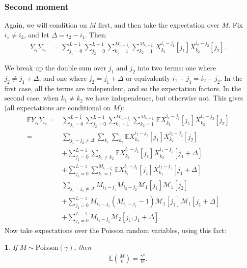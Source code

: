 \documentclass[12pt]{article}
\newcommand{\E}{\mathbb{E}}
\newcommand{\1}{\mathbf{1}}
\newcommand{\Poisson}{\text{Poisson}}
\newcommand{\M}{\mathcal{M}}
\theoremstyle{plain}
\theoremstyle{definition}
\theoremstyle{remark}
\theoremstyle{plain}
\newtheorem{lem}[thm]{\protect\lemmaname}
\theoremstyle{remark}
\theoremstyle{plain}
\theoremstyle{plain}
\theoremstyle{plain}
\providecommand{\lemmaname}{Lemma}
\numberwithin{equation}{section}
\begin{document}
%


\subsubsection{Second moment}

Again, we will condition on $M$ first, and then take the expectation over $M$. Fix $i_1 \ne i_2$, and let $\Delta = i_2 - i_1$. Then:
%
\begin{align}
%
Y_{i_1} Y_{i_2} 
&= \sum_{j_1=0}^{L-1} \sum_{j_2=0}^{L-1} 
\sum_{k_1=1}^{M_{i_1-j_1}}\sum_{k_2=1}^{M_{i_2-j_2}}
X_{k_1}^{i_1-j_1}[j_1] X_{k_2}^{i_2 - j_2}[j_2].
%
\end{align}

We break up the double sum over $j_1$ and $j_2$ into two terms: one where $j_2 \ne j_1 + \Delta$, and one where $j_2 = j_1 + \Delta$ or equivalently $i_1-j_1 = i_2-j_2$. In the first case, all the terms are independent, and so the expectation factors. In the second case, when $k_1 \ne k_2$ we have independence, but otherwise not. This gives (all expectations are conditional on $M$):
%
\begin{align} \label{moment2-condm}
%
\E Y_{i_1} Y_{i_2}
=& \sum_{j_1=0}^{L-1} \sum_{j_2=0}^{L-1} 
\sum_{k_1=1}^{M_{i_1-j_1}}\sum_{k_2=1}^{M_{i_2-j_2}}
\E X_{k_1}^{i_1-j_1}[j_1] X_{k_2}^{i_2 - j_2}[j_2]
\nonumber \\
=& \sum_{j_1 - j_2 \ne \Delta} \sum_{k_1} 
\sum_{k_2} \E X_{k_1}^{i_1-j_1}[j_1] X_{k_2}^{i_2 - j_2}[j_2]
\nonumber \\
& + \sum_{j_1 = 0}^{L-1} \sum_{k_1 \ne k_2} 
\E X_{k_1}^{i_1-j_1}[j_1] X_{k_2}^{i_1 - j_1}[j_1+\Delta]
\nonumber \\
& + \sum_{j_1 = 0}^{L-1} \sum_{k_1=1}^{M_{i_1-j_1}} 
\E X_{k_1}^{i_1-j_1}[j_1] X_{k_1}^{i_1-j_1}[j_1 + \Delta] 
\nonumber \\
=& \sum_{j_1 - j_2 \ne \Delta} M_{i_1-j_1} M_{i_2 - j_2} \M_1[j_1] \M_1[j_2]
\nonumber \\
& + \sum_{j_1 = 0}^{L-1} M_{i_1-j_1}(M_{i_1-j_1} - 1) \M_1[j_1] \M_1[j_1 + \Delta]
\nonumber \\
& + \sum_{j_1 = 0}^{L-1} M_{i_1-j_1} \M_2[j_1,j_1 + \Delta] .
%
\end{align}
%
Now take expectations over the Poisson random variables, using this fact:
%
\begin{lem} \label{lem-choose}
	If $M \sim \Poisson(\gamma)$, then 
	\begin{align}
	\E {M\choose k} = \frac{\gamma^k}{k!}.
	\end{align}
\end{lem}
\end{document}

